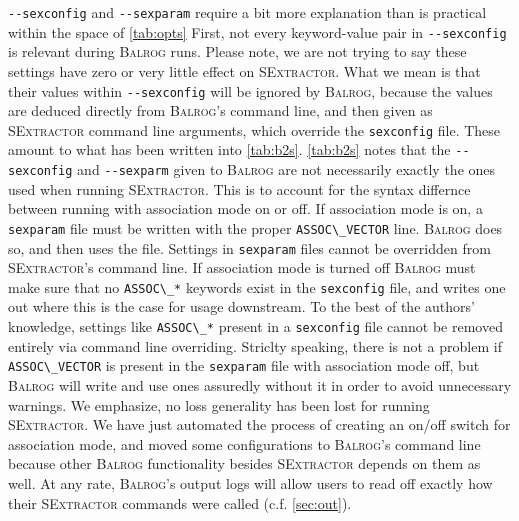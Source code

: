 \documentclass[12pt]{book}
\newcommand{\codett}[1]{\lstinline{#1}}
\newcommand{\balrog}{\textsc{Balrog}}
\newcommand{\sex}{\textsc{SExtractor}}
\newcommand{\opt}[1]{\codett{--#1}}
\begin{document}
\opt{sexconfig} and \opt{sexparam} require a bit more explanation than is practical
within the space of \autoref{tab:opts}
First, not every keyword-value pair in \opt{sexconfig} is relevant during \balrog{} runs.
Please note, we are not trying to say these settings have zero or very little effect on \sex{}.
What we mean is that their values within \opt{sexconfig} will be ignored by \balrog{}, because
the values are deduced directly from \balrog{}'s command line, and then 
given as \sex{} command line arguments, which override the \codett{sexconfig} file.
These amount to what has been written into \autoref{tab:b2s}.
\autoref{tab:b2s} notes that the \opt{sexconfig} and \opt{sexparm} given to \balrog{}
are not necessarily exactly the ones used when running \sex{}.
This is to account for the syntax differnce between running with association mode on or off.
If association mode is on, a \codett{sexparam} file must be written with the proper \codett{ASSOC\_VECTOR} line.
\balrog{} does so, and then uses the file. Settings in \codett{sexparam} files cannot be overridden from \sex{}'s command line.
If association mode is turned off \balrog{} must make sure that no \codett{ASSOC\_*} keywords exist in the \codett{sexconfig} file,
and writes one out where this is the case for usage downstream. To the best of the authors' knowledge,
settings like \codett{ASSOC\_*} present in a \codett{sexconfig} file cannot be removed entirely via command line overriding.
Striclty speaking, there is not a problem if \codett{ASSOC\_VECTOR} is present in the \codett{sexparam} file with association
mode off, but \balrog{} will write and use ones assuredly without it in order to avoid unnecessary warnings.
We emphasize, no loss generality has been lost for running \sex{}.
We have just automated the process of creating an on/off switch for association mode, and moved some
configurations to \balrog{}'s command line because other \balrog{} functionality besides \sex{} depends on them as well.
At any rate, \balrog{}'s output logs will allow users to read off exactly how their \sex{} commands were called (c.f. \autoref{sec:out}).

\optstab{}
\end{document}
